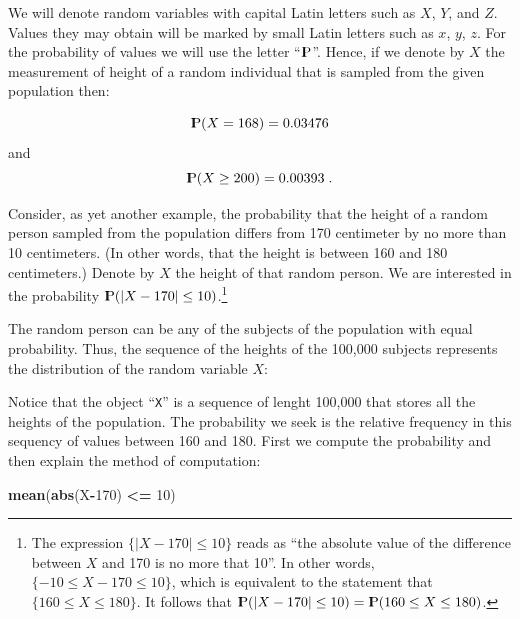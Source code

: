 \documentclass[]{krantz}
\makeatletter
\newenvironment{Shaded}{\begin{snugshade}}{\end{snugshade}}
\newcommand{\KeywordTok}[1]{\textcolor[rgb]{0.13,0.29,0.53}{\textbf{#1}}}
\newcommand{\DataTypeTok}[1]{\textcolor[rgb]{0.13,0.29,0.53}{#1}}
\newcommand{\DecValTok}[1]{\textcolor[rgb]{0.00,0.00,0.81}{#1}}
\newcommand{\StringTok}[1]{\textcolor[rgb]{0.31,0.60,0.02}{#1}}
\newcommand{\OperatorTok}[1]{\textcolor[rgb]{0.81,0.36,0.00}{\textbf{#1}}}
\newcommand{\NormalTok}[1]{#1}
\newcommand{\Prob}{{\rm I\kern-.3em P}}
\newenvironment{kframe}{%
\medskip{}
\setlength{\fboxsep}{.8em}
 \def\at@end@of@kframe{}%
 \ifinner\ifhmode%
  \def\at@end@of@kframe{\end{minipage}}%
  \begin{minipage}{\columnwidth}%
 \fi\fi%
 \def\FrameCommand##1{\hskip\@totalleftmargin \hskip-\fboxsep
 \colorbox{shadecolor}{##1}\hskip-\fboxsep
     \hskip-\linewidth \hskip-\@totalleftmargin \hskip\columnwidth}%
 \MakeFramed {\advance\hsize-\width
   \@totalleftmargin\z@ \linewidth\hsize
   \@setminipage}}%
 {\par\unskip\endMakeFramed%
 \at@end@of@kframe}
\renewenvironment{Shaded}{\begin{kframe}}{\end{kframe}}
\theoremstyle{definition}
\theoremstyle{definition}
\theoremstyle{definition}
\theoremstyle{remark}
\makeatother
\begin{document}
We will denote random variables with capital Latin letters such as
\(X\), \(Y\), and \(Z\). Values they may obtain will be marked by small
Latin letters such as \(x\), \(y\), \(z\). For the probability of values
we will use the letter ``\(\Prob\)''. Hence, if we denote by \(X\) the
measurement of height of a random individual that is sampled from the
given population then:

\[\Prob(X = 168) = 0.03476\] and \[\Prob(X \geq 200) = 0.00393\;.\]

Consider, as yet another example, the probability that the height of a
random person sampled from the population differs from 170 centimeter by
no more than 10 centimeters. (In other words, that the height is between
160 and 180 centimeters.) Denote by \(X\) the height of that random
person. We are interested in the probability
\(\Prob(|X -170| \leq 10)\).\footnote{The expression
  \(\{|X -170| \leq 10\}\) reads as ``the absolute value of the
  difference between \(X\) and 170 is no more that 10''. In other words,
  \(\{-10 \leq X - 170 \leq 10\}\), which is equivalent to the statement
  that \(\{160 \leq X \leq 180\}\). It follows that
  \(\Prob(|X-170|\leq 10) = \Prob(160\leq X \leq 180)\).}

The random person can be any of the subjects of the population with
equal probability. Thus, the sequence of the heights of the 100,000
subjects represents the distribution of the random variable \(X\):

\begin{Shaded}
\end{Shaded}

Notice that the object ``\texttt{X}'' is a sequence of lenght 100,000
that stores all the heights of the population. The probability we seek
is the relative frequency in this sequency of values between 160 and
180. First we compute the probability and then explain the method of
computation:

\begin{Shaded}
\begin{Highlighting}[]
\KeywordTok{mean}\NormalTok{(}\KeywordTok{abs}\NormalTok{(X}\OperatorTok{-}\DecValTok{170}\NormalTok{) }\OperatorTok{<=}\StringTok{ }\DecValTok{10}\NormalTok{)}
\end{Highlighting}
\end{Shaded}
\end{document}
